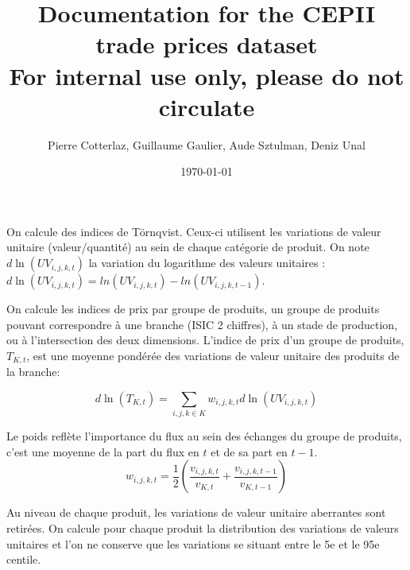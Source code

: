 \documentclass[12pt]{article}
\title{Documentation for the CEPII trade prices dataset \\
\small{For internal use only, please do not circulate}}
\author{Pierre Cotterlaz, Guillaume Gaulier, Aude Sztulman, Deniz Unal}
\date{\today}
\begin{document}
\maketitle

On calcule des indices de Törnqvist. Ceux-ci utilisent les variations de valeur unitaire (valeur/quantité) au sein de chaque catégorie de produit. On note $d\ln(UV_{i,j,k,t})$ la variation du logarithme des valeurs unitaires : $d\ln(UV_{i,j,k,t}) = ln(UV_{i,j,k,t}) - ln(UV_{i,j,k,t-1})$. 

On calcule les indices de prix par groupe de produits, un groupe de produits pouvant correspondre à une branche (ISIC 2 chiffres), à un stade de production, ou à l'intersection des deux dimensions. L'indice de prix d'un groupe de produits, $T_{K,t}$, est une moyenne pondérée des variations de valeur unitaire des produits de la branche: 

\begin{equation*}
    d\ln(T_{K,t}) = \sum_{i,j,k \in K} w_{i,j,k,t} d\ln(UV_{i,j,k,t})
\end{equation*}

Le poids reflète l'importance du flux au sein des échanges du groupe de produits, c'est une moyenne de la part du flux en $t$ et de sa part en $t-1$. 
$$w_{i,j,k,t} = \frac{1}{2} \left( \frac{v_{i,j,k,t}}{v_{K,t}} + \frac{v_{i,j,k,t-1}}{v_{K,t-1}}  \right)$$

Au niveau de chaque produit, les variations de valeur unitaire aberrantes sont retirées. On calcule pour chaque produit la distribution des variations de valeurs unitaires et l'on ne conserve que les variations se situant entre le 5e et le 95e centile.
\end{document}
